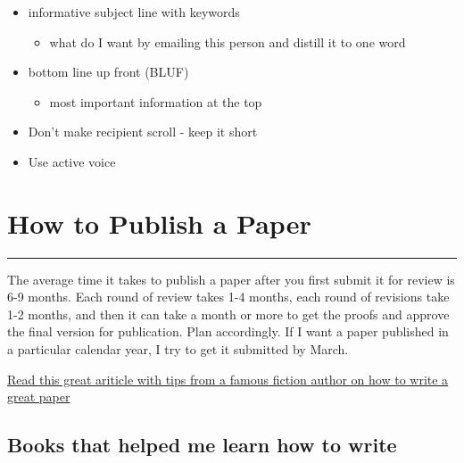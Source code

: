 \documentclass[
  letterpaper,
  DIV=11,
  numbers=noendperiod]{scrreprt}
\providecommand{\tightlist}{%
  \setlength{\itemsep}{0pt}\setlength{\parskip}{0pt}}\usepackage{longtable,booktabs,array}
\begin{document}
\begin{itemize}
  \begin{itemize}
  \item
    informative subject line with keywords

    \begin{itemize}
    \tightlist
    \item
      what do I want by emailing this person and distill it to one word
    \end{itemize}
  \item
    bottom line up front (BLUF)

    \begin{itemize}
    \tightlist
    \item
      most important information at the top
    \end{itemize}
  \item
    Don't make recipient scroll - keep it short
  \item
    Use active voice\\
  \end{itemize}
\end{itemize}

\hypertarget{how-to-publish-a-paper}{%
\chapter{How to Publish a Paper}\label{how-to-publish-a-paper}}

\begin{center}\rule{0.5\linewidth}{0.5pt}\end{center}

The average time it takes to publish a paper after you first submit it
for review is 6-9 months. Each round of review takes 1-4 months, each
round of revisions take 1-2 months, and then it can take a month or more
to get the proofs and approve the final version for publication. Plan
accordingly. If I want a paper published in a particular calendar year,
I try to get it submitted by March.

\href{https://www.nature.com/articles/d41586-019-02918-5}{Read this
great ariticle with tips from a famous fiction author on how to write a
great paper}

\hypertarget{books-that-helped-me-learn-how-to-write}{%
\section*{\texorpdfstring{\textbf{Books that helped me learn how to
write}}{Books that helped me learn how to write}}\label{books-that-helped-me-learn-how-to-write}}
\end{document}
